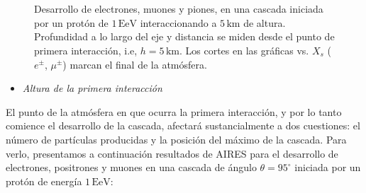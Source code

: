 \documentclass[12 pt, a4paper]{article} %
\numberwithin{equation}{section}
\numberwithin{figure}{section}
\numberwithin{table}{section}
\begin{document}
\begin{figure}[H]
	\centering
	\\
	\\
	\caption{Desarrollo de electrones, muones y piones, en una cascada iniciada por un protón de $1\,\mathrm{EeV}$ interaccionando a $5\,\mathrm{km}$ de altura. Profundidad a lo largo del eje y distancia se miden desde el punto de primera interacción, i.e,  $h=5\,\mathrm{km}$. Los cortes en las gráficas vs. $X_s$ ($e^\pm$, $\mu^\pm$) marcan el final de la atmósfera.}
	\label{Carac_UG_vardeg}
\end{figure}
\begin{itemize}
	\item \textit{Altura de la primera interacción}
\end{itemize}
El punto de la atmósfera en que ocurra la primera interacción, y por lo tanto comience el desarrollo de la cascada, afectará sustancialmente a dos cuestiones: el número de partículas producidas y la posición del máximo de la cascada. Para verlo, presentamos a continuación resultados de AIRES para el desarrollo de electrones, positrones y muones en una cascada de ángulo $\theta=95^\circ$ iniciada por un protón de energía $1\,\mathrm{EeV}$:
\end{document}
